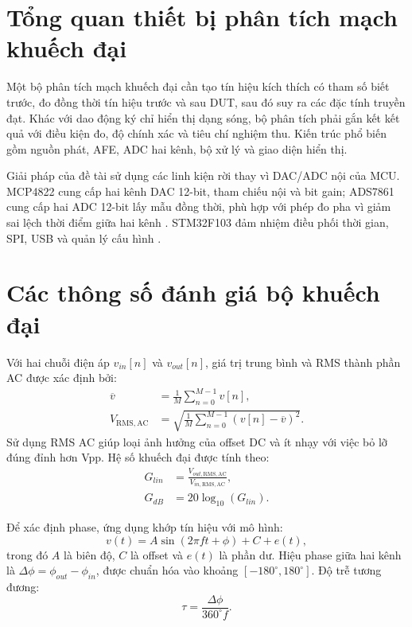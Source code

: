 \documentclass[12pt,a4paper]{report}
\begin{document}
\section{Tổng quan thiết bị phân tích mạch khuếch đại}
Một bộ phân tích mạch khuếch đại cần tạo tín hiệu kích thích có tham số biết trước, đo đồng thời tín hiệu trước và sau DUT, sau đó suy ra các đặc tính truyền đạt. Khác với dao động ký chỉ hiển thị dạng sóng, bộ phân tích phải gắn kết kết quả với điều kiện đo, độ chính xác và tiêu chí nghiệm thu. Kiến trúc phổ biến gồm nguồn phát, AFE, ADC hai kênh, bộ xử lý và giao diện hiển thị.

Giải pháp của đề tài sử dụng các linh kiện rời thay vì DAC/ADC nội của MCU. MCP4822 cung cấp hai kênh DAC 12-bit, tham chiếu nội và bit gain; ADS7861 cung cấp hai ADC 12-bit lấy mẫu đồng thời, phù hợp với phép đo pha vì giảm sai lệch thời điểm giữa hai kênh \cite{mcp4822,ads7861}. STM32F103 đảm nhiệm điều phối thời gian, SPI, USB và quản lý cấu hình \cite{stm32ds,stm32rm}.

\section{Các thông số đánh giá bộ khuếch đại}
Với hai chuỗi điện áp $v_{in}[n]$ và $v_{out}[n]$, giá trị trung bình và RMS thành phần AC được xác định bởi:
\begin{align}
\overline{v} &= \frac{1}{M}\sum_{n=0}^{M-1}v[n],\\
V_{\mathrm{RMS,AC}} &= \sqrt{\frac{1}{M}\sum_{n=0}^{M-1}\left(v[n]-\overline{v}\right)^2}.
\end{align}
Sử dụng RMS AC giúp loại ảnh hưởng của offset DC và ít nhạy với việc bỏ lỡ đúng đỉnh hơn Vpp. Hệ số khuếch đại được tính theo:
\begin{align}
G_{lin} &= \frac{V_{out,\mathrm{RMS,AC}}}{V_{in,\mathrm{RMS,AC}}},\\
G_{dB} &= 20\log_{10}(G_{lin}).
\end{align}

Để xác định phase, ứng dụng khớp tín hiệu với mô hình:
\begin{equation}
v(t)=A\sin(2\pi ft+\phi)+C+e(t),
\end{equation}
trong đó $A$ là biên độ, $C$ là offset và $e(t)$ là phần dư. Hiệu phase giữa hai kênh là $\Delta\phi=\phi_{out}-\phi_{in}$, được chuẩn hóa vào khoảng $[-180^\circ,180^\circ]$. Độ trễ tương đương:
\begin{equation}
\tau=\frac{\Delta\phi}{360^\circ f}.
\end{equation}
\end{document}
